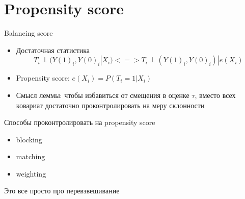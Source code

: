 
\section{Propensity score}

\begin{frame}{Balancing score}
\begin{itemize}
    \item Достаточная статистика
    $$T_i \perp (Y(1)_i, Y(0)_i | X_i) <=> T_i \perp (Y(1)_i, Y(0)_i)  | e(X_i)$$
    \item Propensity score:
    $e(X_i)=P(T_i = 1 | X_i)$
    \item Смысл леммы: чтобы избавиться от смещения в оценке $\tau$, вместо всех ковариат достаточно проконтролировать на  меру склонности
    \end{itemize}
\end{frame}



\begin{frame}{Способы проконтролировать на propensity score}
\begin{itemize}
    \item blocking
    \item matching
    \item weighting
\end{itemize}
Это все просто про перевзвешивание
\end{frame}



    
